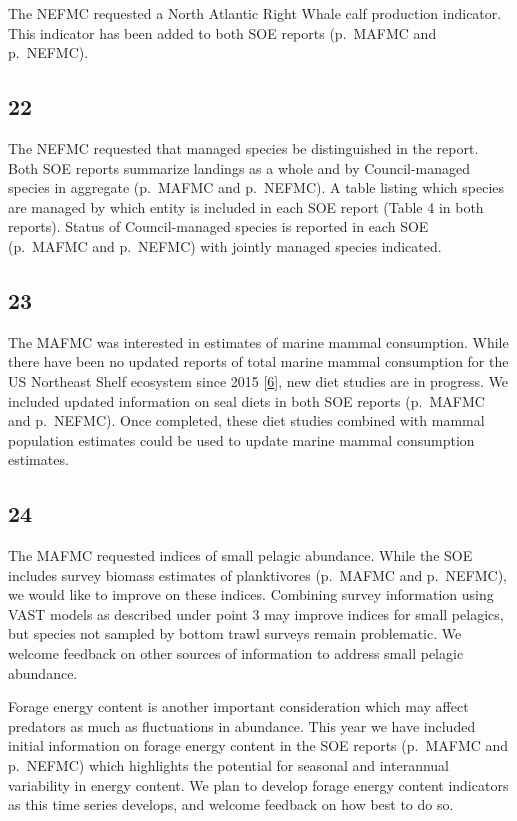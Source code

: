 \documentclass[
  10pt,
]{article}
\begin{document}
The NEFMC requested a North Atlantic Right Whale calf production
indicator. This indicator has been added to both SOE reports (p.~MAFMC
and p.~NEFMC).

\hypertarget{section-21}{%
\subsection{22}\label{section-21}}

The NEFMC requested that managed species be distinguished in the report.
Both SOE reports summarize landings as a whole and by Council-managed
species in aggregate (p.~MAFMC and p.~NEFMC). A table listing which
species are managed by which entity is included in each SOE report
(Table 4 in both reports). Status of Council-managed species is reported
in each SOE (p.~MAFMC and p.~NEFMC) with jointly managed species
indicated.

\hypertarget{section-22}{%
\subsection{23}\label{section-22}}

The MAFMC was interested in estimates of marine mammal consumption.
While there have been no updated reports of total marine mammal
consumption for the US Northeast Shelf ecosystem since 2015
{[}\protect\hyperlink{ref-smith_consumption_2015}{6}{]}, new diet
studies are in progress. We included updated information on seal diets
in both SOE reports (p.~MAFMC and p.~NEFMC). Once completed, these diet
studies combined with mammal population estimates could be used to
update marine mammal consumption estimates.

\hypertarget{section-23}{%
\subsection{24}\label{section-23}}

The MAFMC requested indices of small pelagic abundance. While the SOE
includes survey biomass estimates of planktivores (p.~MAFMC and
p.~NEFMC), we would like to improve on these indices. Combining survey
information using VAST models as described under point 3 may improve
indices for small pelagics, but species not sampled by bottom trawl
surveys remain problematic. We welcome feedback on other sources of
information to address small pelagic abundance.

Forage energy content is another important consideration which may
affect predators as much as fluctuations in abundance. This year we have
included initial information on forage energy content in the SOE reports
(p.~MAFMC and p.~NEFMC) which highlights the potential for seasonal and
interannual variability in energy content. We plan to develop forage
energy content indicators as this time series develops, and welcome
feedback on how best to do so.
\end{document}
